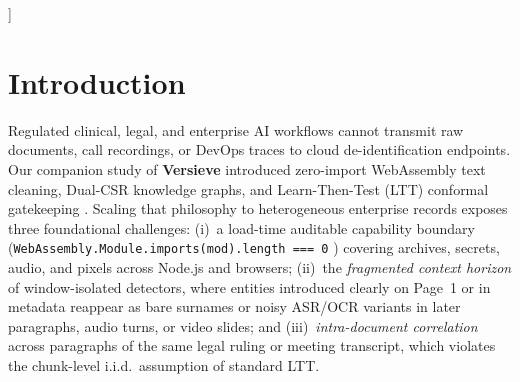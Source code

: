 \documentclass{article}
\begin{document}
\begin{abstract}
while streaming \textbf{\texttt{E-LTT}} certifies anytime-valid bounds ($E_{\max}{=}23.76 \ge 1/\delta$, $0.18\%$ FPR at $\alpha{=}0.05$). On $520$ external secret/code files ($10\times$ steady-state), \texttt{verisieve\_media.wasm} ($72.25\%$ F1) runs $1.5\times$--$22.8\times$ faster than \texttt{Gitleaks v8.30.1} and Yelp \texttt{detect-secrets}. Across $25$ spoken calls ($97$ planted PII tokens) attacked by $3.3\times$ larger \texttt{faster-whisper small.en}, \textbf{\texttt{WASM SR-MP} phonetic coupling} cuts residual PII leakage from $94.85\%$ (raw) and $20.62\%$ (isolated ITN+GLiNER) down to $\mathbf{8.25\%}$ ($-86.60$\,pp, $91.30\%$ relative reduction, $21/25$ calls zero leak; the attacker transcription still recognizes $100\%$ of the $59$ pre-declared non-PII context words), with the ring seeded solely from the engine's own in-call detections, although a plain Jaro-Winkler baseline on the same anchor list reaches $7.22\%$, so the salted ring's contribution is anchor privacy, not matching accuracy.
\end{abstract}
]

\section{Introduction}
\label{sec:intro}

Regulated clinical, legal, and enterprise AI workflows cannot transmit raw documents, call recordings, or DevOps traces to cloud de-identification endpoints. Our companion study of \textbf{Versieve} \citep{ardiyansyah2026verisieve} introduced zero-import WebAssembly text cleaning, Dual-CSR knowledge graphs, and Learn-Then-Test (LTT) conformal gatekeeping \citep{angelopoulos2021ltt}. Scaling that philosophy to heterogeneous enterprise records exposes three foundational challenges: (i)~a load-time auditable capability boundary (\texttt{WebAssembly.Module.imports(mod).length === 0} \citep{haas2017wasm}) covering archives, secrets, audio, and pixels across Node.js and browsers; (ii)~the \emph{fragmented context horizon} of window-isolated detectors, where entities introduced clearly on Page~1 or in metadata reappear as bare surnames or noisy ASR/OCR variants in later paragraphs, audio turns, or video slides; and (iii)~\emph{intra-document correlation} across paragraphs of the same legal ruling or meeting transcript, which violates the chunk-level i.i.d.\ assumption of standard LTT.
\end{document}
